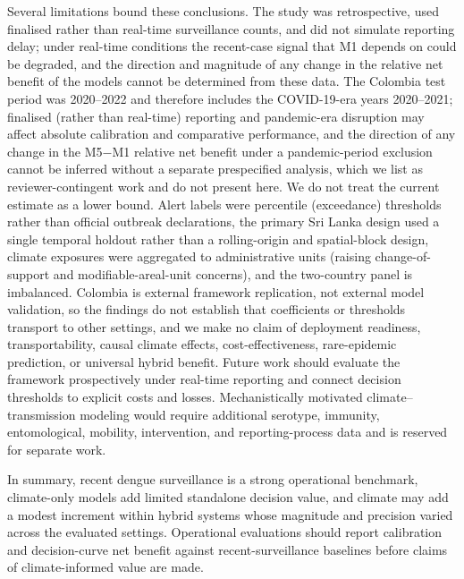 \documentclass[11pt,a4paper]{article}
\begin{document}
Several limitations bound these conclusions. The study was retrospective, used finalised rather than real-time surveillance counts, and did not simulate reporting delay; under real-time conditions the recent-case signal that M1 depends on could be degraded, and the direction and magnitude of any change in the relative net benefit of the models cannot be determined from these data. The Colombia test period was 2020--2022 and therefore includes the COVID-19-era years 2020--2021; finalised (rather than real-time) reporting and pandemic-era disruption may affect absolute calibration and comparative performance, and the direction of any change in the M5$-$M1 relative net benefit under a pandemic-period exclusion cannot be inferred without a separate prespecified analysis, which we list as reviewer-contingent work and do not present here. We do not treat the current estimate as a lower bound. Alert labels were percentile (exceedance) thresholds rather than official outbreak declarations, the primary Sri Lanka design used a single temporal holdout rather than a rolling-origin and spatial-block design, climate exposures were aggregated to administrative units (raising change-of-support and modifiable-areal-unit concerns), and the two-country panel is imbalanced. Colombia is external framework replication, not external model validation, so the findings do not establish that coefficients or thresholds transport to other settings, and we make no claim of deployment readiness, transportability, causal climate effects, cost-effectiveness, rare-epidemic prediction, or universal hybrid benefit. Future work should evaluate the framework prospectively under real-time reporting and connect decision thresholds to explicit costs and losses. Mechanistically motivated climate--transmission modeling would require additional serotype, immunity, entomological, mobility, intervention, and reporting-process data and is reserved for separate work.

In summary, recent dengue surveillance is a strong operational benchmark, climate-only models add limited standalone decision value, and climate may add a modest increment within hybrid systems whose magnitude and precision varied across the evaluated settings. Operational evaluations should report calibration and decision-curve net benefit against recent-surveillance baselines before claims of climate-informed value are made.

\end{document}
